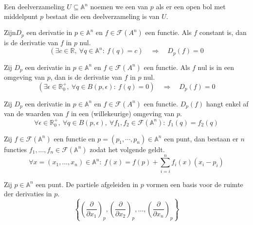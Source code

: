 \documentclass[main.tex]{subfiles}
\begin{document}
\begin{de}
  Een deelverzameling $U \subseteq \mathbb{A}^{n}$ noemen we een  van $p$ als er een open bol met middelpunt $p$ bestaat die een deelverzameling is van $U$.
\end{de}

\begin{lem}
  Zijn$D_{p}$ een derivatie in $p\in\mathbb{A}^{n}$ en $f\in\mathcal{F}(A^{n})$ een functie.
  Als $f$ constant is, dan is de derivatie van $f$ in $p$ nul.
  \[ (\exists c\in\mathbb{R},\ \forall q\in\mathbb{A}^{n}:\ f(q) = c) \quad\Rightarrow\quad D_{p}(f) = 0 \]
\end{lem}

\begin{lem}
  Zij $D_{p}$ een derivatie in $p\in\mathbb{A}^{n}$ en $f\in\mathcal{F}(A^{n})$ een functie.
  Als $f$ nul is in een omgeving van $p$, dan is de derivatie van $f$ in $p$ nul.
  \[ (\exists \epsilon\in\mathbb{R}^{+}_{0},\ \forall q \in B(p,\epsilon):\ f(q) = 0) \quad\Rightarrow\quad D_{p}(f) = 0 \]
\end{lem}

\begin{lem}
  Zij $D_{p}$ een derivatie in $p\in\mathbb{A}^{n}$ en $f\in\mathcal{F}(A^{n})$ een functie.
  $D_{p}(f)$ hangt enkel af van de waarden van $f$ in een (willekeurige) omgeving van $p$.
  \[ \forall \epsilon\in\mathbb{R}^{+}_{0},\ \forall q \in B(p,\epsilon),\ \forall f_{1},f_{2}\in\mathcal{F}(\mathbb{A}^{n}):\ f_{1}(q) = f_{2}(q) \]
\end{lem}

\begin{lem}
  Zij $f \in \mathcal{F}(\mathbb{A}^{n})$ een functie en $p = (p_{1},\dotsb,p_{n}) \in \mathbb{A}^{n}$ een punt, dan bestaan er $n$ functies $f_{1},\dotsc,f_{n} \in \mathcal{F}(\mathbb{A}^{n})$ zodat het volgende geldt.
  \[
  \forall x = (x_{1},\dotsc,x_{n})\in\mathbb{A}^{n}:\ f(x) = f(p) + \sum_{i=i}^{n}f_{i}(x)(x_{i}-p_{i})
  \]
\end{lem}

\begin{st}
  Zij $p\in\mathbb{A}^{n}$ een punt.
  De partiele afgeleiden in $p$ vormen een basis voor de ruimte der derivaties in $p$.
  \[ \left\{ \left(\frac{\partial}{\partial x_{1}}\right)_{p}, \left(\frac{\partial}{\partial x_{2}}\right)_{p}, \dotsc , \left(\frac{\partial}{\partial x_{n}}\right)_{p}\right\}  \]
\end{st}
\end{document}
